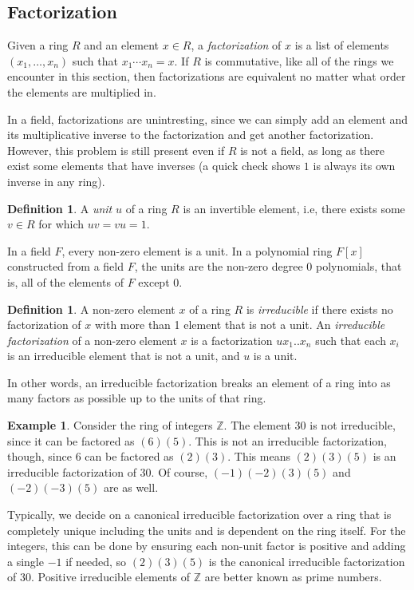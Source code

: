 \documentclass{article}
\theoremstyle{definition}
\newtheorem{defin}[thm]{Definition}
\newtheorem{exa}[thm]{Example}
\begin{document}
\subsection{Factorization}


    Given a ring $R$ and an element $x \in R$, a \emph{factorization} of $x$ is a list of elements $(x_1, \ldots ,x_n)$ such that $x_1\cdots x_n = x$. If $R$ is commutative, like all of the rings we encounter in this section, then factorizations are equivalent no matter what order the elements are multiplied in.
    
    In a field, factorizations are unintresting, since we can simply add an element and its multiplicative inverse to the factorization and get another factorization. However, this problem is still present even if $R$ is not a field, as long as there exist some elements that have inverses (a quick check shows $1$ is always its own inverse in any ring).
    
    \begin{defin}
        A \emph{unit} $u$ of a ring $R$ is an invertible element, i.e, there exists some $v \in R$ for which $uv = vu = 1$.
    \end{defin}
    
    In a field $F$, every non-zero element is a unit. In a polynomial ring $F[x]$ constructed from a field $F$, the units are the non-zero degree $0$ polynomials, that is, all of the elements of $F$ except $0$. 
    
    \begin{defin}
        A non-zero element $x$ of a ring $R$ is \emph{irreducible} if there exists no factorization of $x$ with more than 1 element that is not a unit. An \emph{irreducible factorization} of a non-zero element $x$ is a factorization $ux_1..x_n$ such that each $x_i$ is an irreducible element that is not a unit, and $u$ is a unit.
    \end{defin}
    
    In other words, an irreducible factorization breaks an element of a ring into as many factors as possible up to the units of that ring.
    
    \begin{exa}
        Consider the ring of integers $\mathbb{Z}$. The element 30 is not irreducible, since it can be factored as $(6)(5)$. This is not an irreducible factorization, though, since $6$ can be factored as $(2)(3)$. This means $(2)(3)(5)$ is an irreducible factorization of 30. Of course, $(-1)(-2)(3)(5)$ and $(-2)(-3)(5)$ are as well. 
        
        Typically, we decide on a canonical irreducible factorization over a ring that is completely unique including the units and is dependent on the ring itself. For the integers, this can be done by ensuring each non-unit factor is positive and adding a single $-1$ if needed, so $(2)(3)(5)$ is the canonical irreducible factorization of 30. Positive irreducible elements of $\mathbb{Z}$ are better known as prime numbers.
    \end{exa}
    
\end{document}
